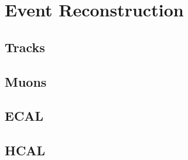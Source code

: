 \chapter{Event Reconstruction}
\label{reconstruction_chapter}
\section{Tracks}

\section{Muons}

\section{ECAL}

\section{HCAL}


